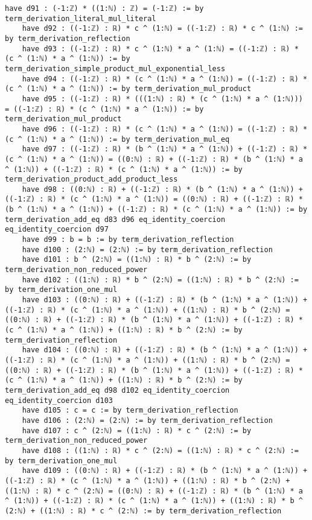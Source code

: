 \documentclass{article}
\begin{document}
\begin{tcolorbox}[colback=white!10, width=\linewidth]
\begin{lstlisting}[language=Lean4]
    have d91 : (-1:ℤ) * ((1:ℕ) : ℤ) = (-1:ℤ) := by term_derivation_literal_mul_literal
    have d92 : ((-1:ℤ) : ℝ) * c ^ (1:ℕ) = ((-1:ℤ) : ℝ) * c ^ (1:ℕ) := by term_derivation_reflection
    have d93 : ((-1:ℤ) : ℝ) * c ^ (1:ℕ) * a ^ (1:ℕ) = ((-1:ℤ) : ℝ) * (c ^ (1:ℕ) * a ^ (1:ℕ)) := by term_derivation_simple_product_mul_exponential_less
    have d94 : ((-1:ℤ) : ℝ) * (c ^ (1:ℕ) * a ^ (1:ℕ)) = ((-1:ℤ) : ℝ) * (c ^ (1:ℕ) * a ^ (1:ℕ)) := by term_derivation_mul_product
    have d95 : ((-1:ℤ) : ℝ) * (((1:ℕ) : ℝ) * (c ^ (1:ℕ) * a ^ (1:ℕ))) = ((-1:ℤ) : ℝ) * (c ^ (1:ℕ) * a ^ (1:ℕ)) := by term_derivation_mul_product
    have d96 : ((-1:ℤ) : ℝ) * (c ^ (1:ℕ) * a ^ (1:ℕ)) = ((-1:ℤ) : ℝ) * (c ^ (1:ℕ) * a ^ (1:ℕ)) := by term_derivation_mul_eq
    have d97 : ((-1:ℤ) : ℝ) * (b ^ (1:ℕ) * a ^ (1:ℕ)) + ((-1:ℤ) : ℝ) * (c ^ (1:ℕ) * a ^ (1:ℕ)) = ((0:ℕ) : ℝ) + ((-1:ℤ) : ℝ) * (b ^ (1:ℕ) * a ^ (1:ℕ)) + ((-1:ℤ) : ℝ) * (c ^ (1:ℕ) * a ^ (1:ℕ)) := by term_derivation_product_add_product_less
    have d98 : ((0:ℕ) : ℝ) + ((-1:ℤ) : ℝ) * (b ^ (1:ℕ) * a ^ (1:ℕ)) + ((-1:ℤ) : ℝ) * (c ^ (1:ℕ) * a ^ (1:ℕ)) = ((0:ℕ) : ℝ) + ((-1:ℤ) : ℝ) * (b ^ (1:ℕ) * a ^ (1:ℕ)) + ((-1:ℤ) : ℝ) * (c ^ (1:ℕ) * a ^ (1:ℕ)) := by term_derivation_add_eq d83 d96 eq_identity_coercion eq_identity_coercion d97
    have d99 : b = b := by term_derivation_reflection
    have d100 : (2:ℕ) = (2:ℕ) := by term_derivation_reflection
    have d101 : b ^ (2:ℕ) = ((1:ℕ) : ℝ) * b ^ (2:ℕ) := by term_derivation_non_reduced_power
    have d102 : ((1:ℕ) : ℝ) * b ^ (2:ℕ) = ((1:ℕ) : ℝ) * b ^ (2:ℕ) := by term_derivation_one_mul
    have d103 : ((0:ℕ) : ℝ) + ((-1:ℤ) : ℝ) * (b ^ (1:ℕ) * a ^ (1:ℕ)) + ((-1:ℤ) : ℝ) * (c ^ (1:ℕ) * a ^ (1:ℕ)) + ((1:ℕ) : ℝ) * b ^ (2:ℕ) = ((0:ℕ) : ℝ) + ((-1:ℤ) : ℝ) * (b ^ (1:ℕ) * a ^ (1:ℕ)) + ((-1:ℤ) : ℝ) * (c ^ (1:ℕ) * a ^ (1:ℕ)) + ((1:ℕ) : ℝ) * b ^ (2:ℕ) := by term_derivation_reflection
    have d104 : ((0:ℕ) : ℝ) + ((-1:ℤ) : ℝ) * (b ^ (1:ℕ) * a ^ (1:ℕ)) + ((-1:ℤ) : ℝ) * (c ^ (1:ℕ) * a ^ (1:ℕ)) + ((1:ℕ) : ℝ) * b ^ (2:ℕ) = ((0:ℕ) : ℝ) + ((-1:ℤ) : ℝ) * (b ^ (1:ℕ) * a ^ (1:ℕ)) + ((-1:ℤ) : ℝ) * (c ^ (1:ℕ) * a ^ (1:ℕ)) + ((1:ℕ) : ℝ) * b ^ (2:ℕ) := by term_derivation_add_eq d98 d102 eq_identity_coercion eq_identity_coercion d103
    have d105 : c = c := by term_derivation_reflection
    have d106 : (2:ℕ) = (2:ℕ) := by term_derivation_reflection
    have d107 : c ^ (2:ℕ) = ((1:ℕ) : ℝ) * c ^ (2:ℕ) := by term_derivation_non_reduced_power
    have d108 : ((1:ℕ) : ℝ) * c ^ (2:ℕ) = ((1:ℕ) : ℝ) * c ^ (2:ℕ) := by term_derivation_one_mul
    have d109 : ((0:ℕ) : ℝ) + ((-1:ℤ) : ℝ) * (b ^ (1:ℕ) * a ^ (1:ℕ)) + ((-1:ℤ) : ℝ) * (c ^ (1:ℕ) * a ^ (1:ℕ)) + ((1:ℕ) : ℝ) * b ^ (2:ℕ) + ((1:ℕ) : ℝ) * c ^ (2:ℕ) = ((0:ℕ) : ℝ) + ((-1:ℤ) : ℝ) * (b ^ (1:ℕ) * a ^ (1:ℕ)) + ((-1:ℤ) : ℝ) * (c ^ (1:ℕ) * a ^ (1:ℕ)) + ((1:ℕ) : ℝ) * b ^ (2:ℕ) + ((1:ℕ) : ℝ) * c ^ (2:ℕ) := by term_derivation_reflection

\end{lstlisting}
\end{tcolorbox}
\end{document}
